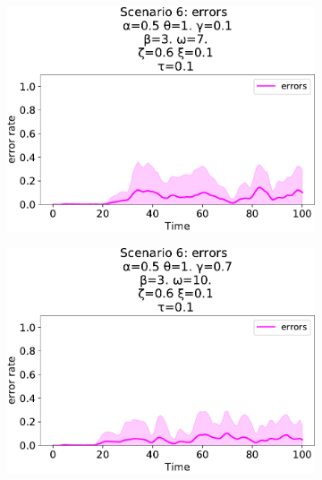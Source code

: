 \begin{figure}[!ht]
\begin{subfigure}[b]{0.32\textwidth}
    \includegraphics[width=\textwidth]{papers/swarm-intelligence2021/img/simulations/movement-errors_0_08_α-0.5_θ-1._γ-0.1_β-3._ω-7._ζ-0.6.pdf}
  \end{subfigure}
  \hfill
  \begin{subfigure}[b]{0.32\textwidth}
    \centering
    \includegraphics[width=\textwidth]{papers/swarm-intelligence2021/img/simulations/movement-errors_0_08_α-0.5_θ-1._γ-0.7_β-3._ω-10._ζ-0.6.pdf}
  \end{subfigure}
  \begin{subfigure}[b]{0.32\textwidth}
    \centering

\end{subfigure}
\end{figure}
